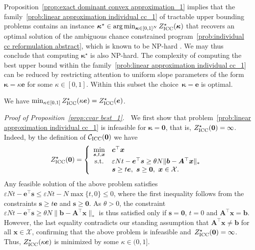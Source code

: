\documentclass[nonblindrev]{informs2017}
\newcommand{\1}[1]{\mathds{1}{\left(#1\right)}}
\begin{document}
Proposition~\ref{prop:exact dominant convex approximation_1} implies that the family~\eqref{prob:linear approximation individual cc_1} of tractable upper bounding problems contains an instance $\bm \kappa^\star\in \arg\min_{\bm \kappa\in [0,1]^N} Z^\star_{\rm ICC}(\bm{\kappa})$ that recovers an optimal solution of the ambiguous chance constrained program~\eqref{prob:individual cc reformulation abstract}, which is known to be NP-hard \citep[Theorem~12]{xie2018bicriteria}. We may thus conclude that computing $\bm\kappa^\star$ is also NP-hard. The complexity of computing the best upper bound within the family~\eqref{prob:linear approximation individual cc_1} can be reduced by restricting attention to uniform slope parameters of the form $\bm{\kappa} = \kappa\bm{e}$ for some $\kappa \in [0,1]$. Within this subset the choice~$\bm \kappa=\bm e$ is optimal.

\begin{proposition}\label{prop:cvar best_1}
	We have $\min_{\kappa \in [0,1]} Z^\star_{\rm ICC}(\kappa\bm{e})= Z^\star_{\rm ICC}(\bm{e})$.
\end{proposition}
\noindent \emph{Proof of Proposition~\ref{prop:cvar best_1}.} $\;$ We first show that problem~\eqref{prob:linear approximation individual cc_1} is infeasible for $\bm \kappa=\bm 0$, that is, $Z^\star_{\rm ICC}(\bm{0})=\infty$. Indeed, by the definition of $\mathcal{C}_{\rm ICC}(\bm{0})$ we have
\[
Z^\star_{\rm ICC}(\bm{0})=\left\{\begin{array}{cll}
\displaystyle \min_{\bm{s},t,\bm{x}} & \bm{c}^\top\bm{x} \\
{\rm s.t.} & \varepsilon N t - \bm{e}^\top\bm{s} \geq  \theta N \|\bm{b} - \bm{A}^\top\bm{x}\|_* \\
&\bm s\ge t\bm e, ~ \bm{s} \geq \bm{0},~\bm{x} \in \mathcal{X}.
\end{array}\right.
\]
Any feasible solution of the above problem satisfies $\varepsilon N t - \bm{e}^\top\bm{s}\le \varepsilon N t - N\max\{t,0\}\le 0$, where the first inequality follows from the constraints $\bm s\ge t\bm e$ and $ \bm{s} \geq \bm{0}$. As $\theta>0$, the constraint $\varepsilon N t - \bm{e}^\top\bm{s} \geq  \theta N \|\bm{b} - \bm{A}^\top\bm{x}\|_*$ is thus satisfied only if $\bm s=\bm 0$, $t=0$ and $\bm{A}^\top\bm{x}=\bm b$. However, the last equality contradicts our standing assumption that  $\bm{A}^\top\bm{x} \ne \bm{b}$ for all $\bm{x} \in \mathcal{X}$, confirming that the above problem is infeasible and~$Z^\star_{\rm ICC}(\bm{0})=\infty$. Thus, $Z^\star_{\rm ICC}(\kappa\bm{e})$ is minimized by some $\kappa \in (0,1]$.
\end{document}
